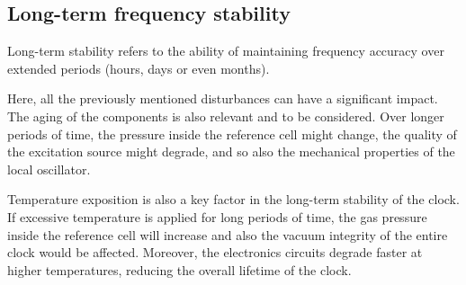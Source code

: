 \subsection{Long-term frequency stability}
\label{subsec:long_term_stability}

Long-term stability refers to the ability of maintaining frequency accuracy over extended periods (hours, days or even months).

Here, all the previously mentioned disturbances can have a significant impact.
The aging of the components is also relevant and to be considered.
Over longer periods of time, the pressure inside the reference cell might change, the quality of the excitation source might degrade, and so also the mechanical properties of the local oscillator.

Temperature exposition is also a key factor in the long-term stability of the clock.
If excessive temperature is applied for long periods of time, the gas pressure inside the reference cell will increase and also the vacuum integrity of the entire clock would be affected.
Moreover, the electronics circuits degrade faster at higher temperatures, reducing the overall lifetime of the clock.
